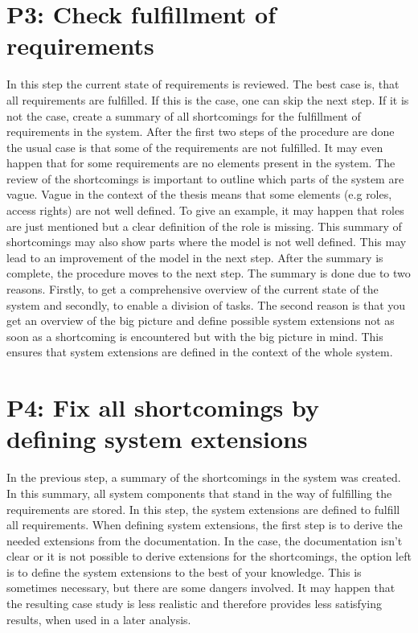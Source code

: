 \section{P3: Check fulfillment of requirements}
\label{cs_check}
In this step the current state of requirements is reviewed. The best case is, that all requirements are fulfilled. If this is the case, one can skip the next step. If it is not the case, create a summary of all shortcomings for the fulfillment of requirements in the system. After the first two steps of the procedure are done the usual case is that some of the requirements are not fulfilled. It may even happen that for some requirements are no elements present in the system. The review of the shortcomings is important to outline which parts of the system are vague. Vague in the context of the thesis means that some elements (e.g roles, access rights) are not well defined. To give an example, it may happen that roles are just mentioned but a clear definition of the role is missing. This summary of shortcomings may also show parts where the model is not well defined. This may lead to an improvement of the model in the next step. After the summary is complete, the procedure moves to the next step. The summary is done due to two reasons. Firstly, to get a comprehensive overview of the current state of the system and secondly, to enable a division of tasks. The second reason is that you get an overview of the big picture and define possible system extensions not as soon as a shortcoming is encountered but with the big picture in mind. This ensures that system extensions are defined in the context of the whole system.

\section{P4: Fix all shortcomings by defining system extensions}
\label{cs_cocome_ext}
In the previous step, a summary of the shortcomings in the system was created. In this summary, all system components that stand in the way of fulfilling the requirements are stored. In this step, the system extensions are defined to fulfill all requirements. When defining system extensions, the first step is to derive the needed extensions from the documentation.  In the case, the documentation isn't clear or it is not possible to derive extensions for the shortcomings, the option left is to define the system extensions to the best of your knowledge. This is sometimes necessary, but there are some dangers involved. It may happen that the resulting case study is less realistic and therefore provides less satisfying results, when used in a later analysis.
